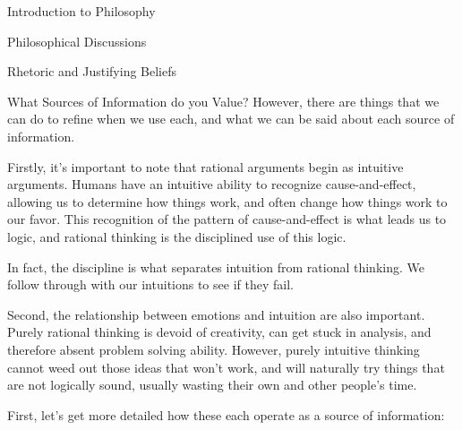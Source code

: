 \begin{chapter}{Introduction to Philosophy}
\begin{section}{Philosophical Discussions}
\begin{subsection}{Rhetoric and Justifying Beliefs}
\begin{subsubsection}{What Sources of Information do you Value?}
                However, there are things that we can do to refine when we use each, and what we can be said about each source of information.
                    
                Firstly, it's important to note that rational arguments begin as intuitive arguments. Humans have an intuitive ability to recognize cause-and-effect, allowing us to determine how things work, and often change how things work to our favor. This recognition of the pattern of cause-and-effect is what leads us to logic, and rational thinking is the disciplined use of this logic. 
                    
                In fact, the discipline is what separates intuition from rational thinking. We follow through with our intuitions to see if they fail.
                    
                Second, the relationship between emotions and intuition are also important. Purely rational thinking is devoid of creativity, can get stuck in analysis, and therefore absent problem solving ability. However, purely intuitive thinking cannot weed out those ideas that won't work, and will naturally try things that are not logically sound, usually wasting their own and other people's time.
                    
                First, let's get more detailed how these each operate as a source of information:
                \begin{itemize}
                        

\end{itemize}
\end{subsubsection}
\end{subsection}
\end{section}
\end{chapter}
